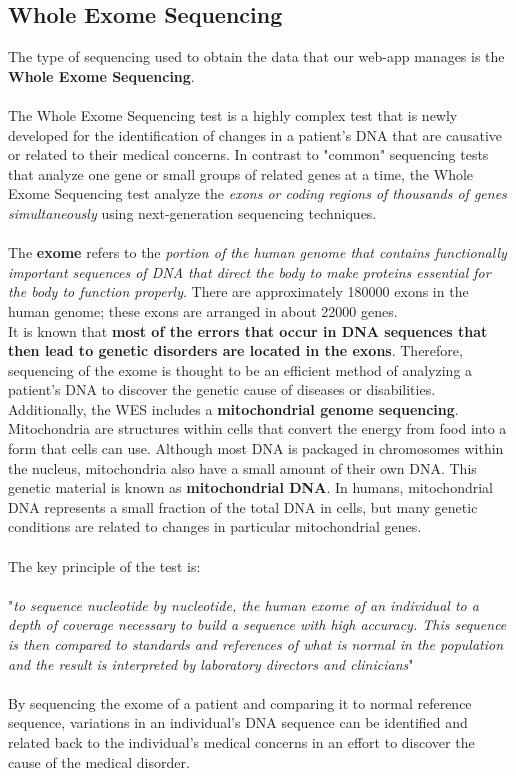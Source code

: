 \subsection{Whole Exome Sequencing}
The type of sequencing used to obtain the data that our web-app manages is the \textbf{Whole Exome Sequencing}.
\\
\\The Whole Exome Sequencing test is a highly complex test that is newly developed for the identification of changes in a patient's DNA that are causative or related to their medical concerns. In contrast to "common" sequencing tests that analyze one gene or small groups of related genes at a time, the Whole Exome Sequencing test analyze the \emph{exons or coding regions of thousands of genes simultaneously} using next-generation sequencing techniques.
\\
\\The \textbf{exome} refers to the \emph{portion of the human genome that contains functionally important sequences of DNA that direct the body to make proteins essential for the body to function properly}. There are approximately 180000 exons in the human genome; these exons are arranged in about 22000 genes.
\\It is known that \textbf{most of the errors that occur in DNA sequences that then lead to genetic disorders are located in the exons}. Therefore, sequencing of the exome is thought to be an efficient method of analyzing a patient's DNA to discover the genetic cause of diseases or disabilities.
\\Additionally, the WES includes a \textbf{mitochondrial genome sequencing}. Mitochondria are structures within cells that convert the energy from food into a form that cells can use. Although most DNA is packaged in chromosomes within the nucleus, mitochondria also have a small amount of their own DNA. This genetic material is known as \textbf{mitochondrial DNA}. In humans, mitochondrial DNA represents a small fraction of the total DNA in cells, but many genetic conditions are related to changes in particular mitochondrial genes.
\\
\\
The key principle of the test is:
\\
\\ "\emph{to sequence nucleotide by nucleotide, the human exome of an individual to a depth of coverage necessary to build a sequence with high accuracy. This sequence is then compared to standards and references of what is normal in the population and the result is interpreted by laboratory directors and clinicians}"
\\
\\ By sequencing the exome of a patient and comparing it to normal reference sequence, variations in an individual's DNA sequence can be identified and related back to the individual's medical concerns in an effort to discover the cause of the medical disorder.


